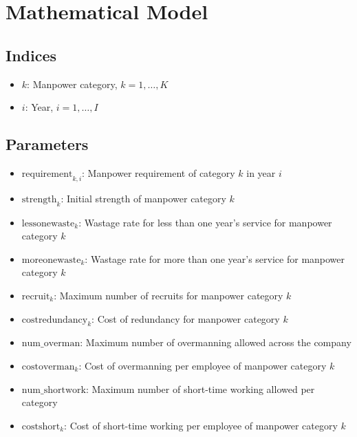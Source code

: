 \documentclass{article}
\begin{document}
\section*{Mathematical Model}

\subsection*{Indices}
\begin{itemize}
    \item \( k \): Manpower category, \( k = 1, \ldots, K \)
    \item \( i \): Year, \( i = 1, \ldots, I \)
\end{itemize}

\subsection*{Parameters}
\begin{itemize}
    \item \( \text{requirement}_{k, i} \): Manpower requirement of category \( k \) in year \( i \)
    \item \( \text{strength}_{k} \): Initial strength of manpower category \( k \)
    \item \( \text{lessonewaste}_{k} \): Wastage rate for less than one year's service for manpower category \( k \)
    \item \( \text{moreonewaste}_{k} \): Wastage rate for more than one year's service for manpower category \( k \)
    \item \( \text{recruit}_{k} \): Maximum number of recruits for manpower category \( k \)
    \item \( \text{costredundancy}_{k} \): Cost of redundancy for manpower category \( k \)
    \item \( \text{num\_overman} \): Maximum number of overmanning allowed across the company
    \item \( \text{costoverman}_{k} \): Cost of overmanning per employee of manpower category \( k \)
    \item \( \text{num\_shortwork} \): Maximum number of short-time working allowed per category
    \item \( \text{costshort}_{k} \): Cost of short-time working per employee of manpower category \( k \)
\end{itemize}
\end{document}

